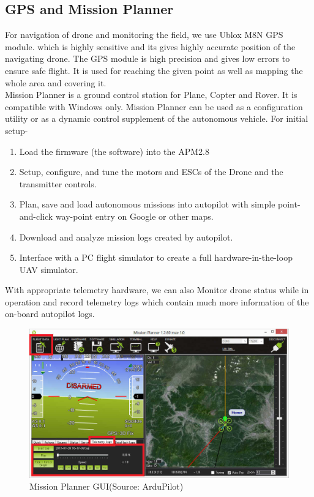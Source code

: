 \subsection{GPS and Mission Planner}
For navigation of drone and monitoring the field, we use Ublox M8N GPS module. which is highly sensitive and its gives highly accurate position of the navigating drone. The GPS module is high precision and gives low errors to ensure safe flight. It is used for reaching the given point as well as mapping the whole area and covering it.
\\
Mission Planner is a ground control station for Plane, Copter and Rover. It is compatible with Windows only. Mission Planner can be used as a configuration utility or as a dynamic control supplement of the autonomous vehicle. For initial setup-
\begin{enumerate}
    \item Load the firmware (the software) into the APM2.8
    \item Setup, configure, and tune the motors and ESCs of the Drone and the transmitter controls.
    \item Plan, save and load autonomous missions into autopilot with simple point-and-click way-point entry on Google or other maps.
    \item Download and analyze mission logs created by autopilot.
    \item Interface with a PC flight simulator to create a full hardware-in-the-loop UAV simulator.
\end{enumerate}

With appropriate telemetry hardware, we can also Monitor drone status while in operation and record telemetry logs which contain much more information of the on-board autopilot logs. 
\begin{figure}[H]
    \centering
    \includegraphics[width=\linewidth]{SummerInterReport/project/Images-Major/mp1.png}
    \caption{Mission Planner GUI(Source: ArduPilot)}
    \label{fig:compEy}
\end{figure}

